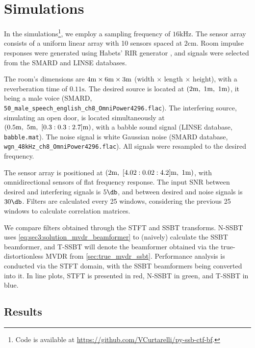 
\section{Simulations}
\label{sec:results}

In the simulations\footnote{Code is available at \url{https://github.com/VCurtarelli/py-ssb-ctf-bf}.}, we employ a sampling frequency of $16\si{\kilo\hertz}$. The sensor array consists of a uniform linear array with 10 sensors spaced at $2\si{\cm}$. Room impulse responses were generated using Habets' RIR generator \cite{habets_rir-generator}, and signals were selected from the SMARD \cite{smard_database} and LINSE \cite{linse_database} databases.

The room's dimensions are $4\si{\meter} \times 6\si{\meter} \times 3\si{\meter}$ (width $\times$ length $\times$ height), with a reverberation time of $0.11\si{\second}$. The desired source is located at $(2\si{\meter},~1\si{\meter},~1\si{\meter})$, it being a male voice (SMARD, \texttt{50\_male\_speech\_english\_ch8\_OmniPower4296.flac}).
%
The interfering source, simulating an open door, is located simultaneously at $(0.5\si{\meter},~5\si{\meter},~[0.3:0.3:2.7]\si{\meter})$, with a babble sound signal (LINSE database, \texttt{babble.mat}). The noise signal is white Gaussian noise (SMARD database, \texttt{wgn\_48kHz\_ch8\_OmniPower4296.flac}). All signals were resampled to the desired frequency.

The sensor array is positioned at $(2\si{\meter},~[4.02:0.02:4.2]\si{\meter},~1\si{\meter})$, with omnidirectional sensors of flat frequency response. The input SNR between desired and interfering signals is $5\dB$, and between desired and noise signals is $30\dB$. Filters are calculated every 25 windows, considering the previous 25 windows to calculate correlation matrices.

We compare filters obtained through the STFT and SSBT transforms. N-SSBT uses \cref{eq:sec3:solution_mvdr_beamformer} to (naively) calculate the SSBT beamformer, and T-SSBT will denote the beamformer obtained via the true-distortionless MVDR from \cref{sec:true_mvdr_ssbt}. Performance analysis is conducted via the STFT domain, with the SSBT beamformers being converted into it. In line plots, STFT is presented in red, N-SSBT in green, and T-SSBT in blue.


\subsection{Results}

